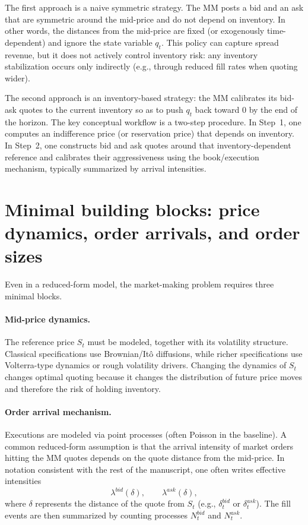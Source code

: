 \documentclass[a4paper,10pt,titlepage,oneside,openany]{book}
\theoremstyle{plain}\newtheorem{theorem}{Theorem}[chapter]
\theoremstyle{definition}\newtheorem{definition}{Definition}[chapter]
\theoremstyle{remark}\newtheorem{remark}{Remark}[chapter]
\begin{document}
The first approach is a naive symmetric strategy. The MM posts a bid and an ask that are symmetric around the mid-price and do not depend on inventory. In other words, the distances from the mid-price are fixed (or exogenously time-dependent) and ignore the state variable $q_t$. This policy can capture spread revenue, but it does not actively control inventory risk: any inventory stabilization occurs only indirectly (e.g., through reduced fill rates when quoting wider).

The second approach is an inventory-based strategy: the MM calibrates its bid-ask quotes to the current inventory so as to push $q_t$ back toward $0$ by the end of the horizon. The key conceptual workflow is a two-step procedure. In Step~1, one computes an indifference price (or reservation price) that depends on inventory. In Step~2, one constructs bid and ask quotes around that inventory-dependent reference and calibrates their aggressiveness using the book/execution mechanism, typically summarized by arrival intensities.

\section{Minimal building blocks: price dynamics, order arrivals, and order sizes}
Even in a reduced-form model, the market-making problem requires three minimal blocks.

\paragraph{Mid-price dynamics.}
The reference price $S_t$ must be modeled, together with its volatility structure. Classical specifications use Brownian/It\^o diffusions, while richer specifications use Volterra-type dynamics or rough volatility drivers. Changing the dynamics of $S_t$ changes optimal quoting because it changes the distribution of future price moves and therefore the risk of holding inventory.

\paragraph{Order arrival mechanism.}
Executions are modeled via point processes (often Poisson in the baseline). A common reduced-form assumption is that the arrival intensity of market orders hitting the MM quotes depends on the quote distance from the mid-price. In notation consistent with the rest of the manuscript, one often writes effective intensities
\[
\lambda^{bid}(\delta), \qquad \lambda^{ask}(\delta),
\]
where $\delta$ represents the distance of the quote from $S_t$ (e.g., $\delta_t^{bid}$ or $\delta_t^{ask}$). The fill events are then summarized by counting processes $N_t^{bid}$ and $N_t^{ask}$.
\end{document}
